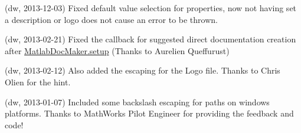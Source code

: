 
\begin{DoxyRefList}
\item[\label{changelog1_5__changelog1_5000001}%
\hypertarget{changelog1_5__changelog1_5000001}{}%
Class \hyperlink{class_matlab_doc_maker}{Matlab\+Doc\+Maker} ](dw, 2013-\/12-\/03) Fixed default value selection for properties, now not having set a description or logo does not cause an error to be thrown.

(dw, 2013-\/02-\/21) Fixed the callback for suggested direct documentation creation after \hyperlink{class_matlab_doc_maker_a434c176c2421dd18a40003919b19f4f2}{Matlab\+Doc\+Maker.\+setup} (Thanks to Aurelien Queffurust)

(dw, 2013-\/02-\/12) Also added the escaping for the Logo file. Thanks to Chris Olien for the hint.

(dw, 2013-\/01-\/07) Included some backslash escaping for paths on windows platforms. Thanks to Math\+Works Pilot Engineer \textquotesingle{} for providing the feedback and code!
\end{DoxyRefList}